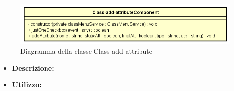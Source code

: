\begin{figure}[h!]
	\centering
	\includegraphics[scale=0.8]{res/sections/SpecificaFrontEnd/Components/Disegnetti/class-add-attribute.png}
	\caption{Diagramma della classe Class-add-attribute}
\end{figure}

\begin{itemize}
	\item \textbf{Descrizione:}\\
	
	\item \textbf{Utilizzo:}\\
	

\end{itemize}
